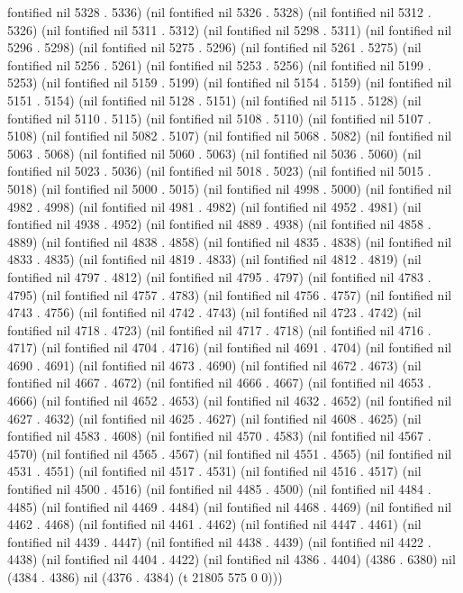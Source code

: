 fontified nil 5328 . 5336) (nil fontified nil 5326 . 5328) (nil fontified nil 5312 . 5326) (nil fontified nil 5311 . 5312) (nil fontified nil 5298 . 5311) (nil fontified nil 5296 . 5298) (nil fontified nil 5275 . 5296) (nil fontified nil 5261 . 5275) (nil fontified nil 5256 . 5261) (nil fontified nil 5253 . 5256) (nil fontified nil 5199 . 5253) (nil fontified nil 5159 . 5199) (nil fontified nil 5154 . 5159) (nil fontified nil 5151 . 5154) (nil fontified nil 5128 . 5151) (nil fontified nil 5115 . 5128) (nil fontified nil 5110 . 5115) (nil fontified nil 5108 . 5110) (nil fontified nil 5107 . 5108) (nil fontified nil 5082 . 5107) (nil fontified nil 5068 . 5082) (nil fontified nil 5063 . 5068) (nil fontified nil 5060 . 5063) (nil fontified nil 5036 . 5060) (nil fontified nil 5023 . 5036) (nil fontified nil 5018 . 5023) (nil fontified nil 5015 . 5018) (nil fontified nil 5000 . 5015) (nil fontified nil 4998 . 5000) (nil fontified nil 4982 . 4998) (nil fontified nil 4981 . 4982) (nil fontified nil 4952 . 4981) (nil fontified nil 4938 . 4952) (nil fontified nil 4889 . 4938) (nil fontified nil 4858 . 4889) (nil fontified nil 4838 . 4858) (nil fontified nil 4835 . 4838) (nil fontified nil 4833 . 4835) (nil fontified nil 4819 . 4833) (nil fontified nil 4812 . 4819) (nil fontified nil 4797 . 4812) (nil fontified nil 4795 . 4797) (nil fontified nil 4783 . 4795) (nil fontified nil 4757 . 4783) (nil fontified nil 4756 . 4757) (nil fontified nil 4743 . 4756) (nil fontified nil 4742 . 4743) (nil fontified nil 4723 . 4742) (nil fontified nil 4718 . 4723) (nil fontified nil 4717 . 4718) (nil fontified nil 4716 . 4717) (nil fontified nil 4704 . 4716) (nil fontified nil 4691 . 4704) (nil fontified nil 4690 . 4691) (nil fontified nil 4673 . 4690) (nil fontified nil 4672 . 4673) (nil fontified nil 4667 . 4672) (nil fontified nil 4666 . 4667) (nil fontified nil 4653 . 4666) (nil fontified nil 4652 . 4653) (nil fontified nil 4632 . 4652) (nil fontified nil 4627 . 4632) (nil fontified nil 4625 . 4627) (nil fontified nil 4608 . 4625) (nil fontified nil 4583 . 4608) (nil fontified nil 4570 . 4583) (nil fontified nil 4567 . 4570) (nil fontified nil 4565 . 4567) (nil fontified nil 4551 . 4565) (nil fontified nil 4531 . 4551) (nil fontified nil 4517 . 4531) (nil fontified nil 4516 . 4517) (nil fontified nil 4500 . 4516) (nil fontified nil 4485 . 4500) (nil fontified nil 4484 . 4485) (nil fontified nil 4469 . 4484) (nil fontified nil 4468 . 4469) (nil fontified nil 4462 . 4468) (nil fontified nil 4461 . 4462) (nil fontified nil 4447 . 4461) (nil fontified nil 4439 . 4447) (nil fontified nil 4438 . 4439) (nil fontified nil 4422 . 4438) (nil fontified nil 4404 . 4422) (nil fontified nil 4386 . 4404) (4386 . 6380) nil (4384 . 4386) nil (4376 . 4384) (t 21805 575 0 0)))
